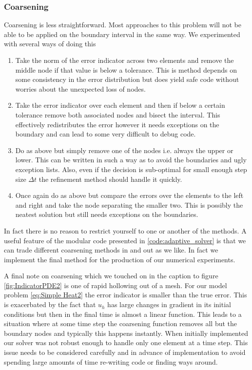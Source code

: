 \documentclass{uonmathreport}
\theoremstyle{definition}
\theoremstyle{problem}
\theoremstyle{theorem}
\begin{document}
\subsubsection{Coarsening} \label{subsubsec:Coarsening}

Coarsening is less straightforward. Most approaches to this problem will not be able to be applied on the boundary interval in the same way. We experimented with several ways of doing this


\begin{enumerate}
\item Take the norm of the error indicator across two elements and remove the middle node if that value is below a tolerance. This is method depends on some consistency in the error distribution but does yield safe code without worries about the unexpected loss of nodes.

\item Take the error indicator over each element and then if below a certain tolerance remove both associated nodes and bisect the interval. This effectively redistributes the error however it needs exceptions on the boundary and can lead to some very difficult to debug code.

\item Do as above but simply remove one of the nodes i.e. always the upper or lower. This can be written in such a way as to avoid the boundaries and ugly exception lists. Also, even if the decision is sub-optimal for small enough step size $ \Delta t$ the refinement method should handle it quickly.

\item Once again do as above but compare the errors over the elements to the left and right and take the node separating the smaller two. This is possibly the neatest solution but still needs exceptions on the boundaries.
\end{enumerate}

In fact there is no reason to restrict yourself to one or another of the methods. A useful feature of the modular code presented in \ref{code:adaptive_solver} is that we can trade different coarsening methods in and out as we like. In fact we implement the final method for the production of our numerical experiments.

A final note on coarsening which we touched on in the caption to figure \ref{fig:IndicatorPDE2} is one of rapid hollowing out of a mesh. For our model problem \ref{eq:Simple Heat2} the error indicator is smaller than the true error. This is exacerbated by the fact that $u_h$ has large changes in gradient in its initial conditions but then in the final time is almost a linear function. This leads to a situation where at some time step the coarsening function removes all but the boundary nodes and typically this happens instantly. When initially implemented our solver was not robust enough to handle only one element at a time step. 
This issue needs to be considered carefully and in advance of implementation to avoid spending large amounts of time re-writing code or finding ways around.
\end{document}
